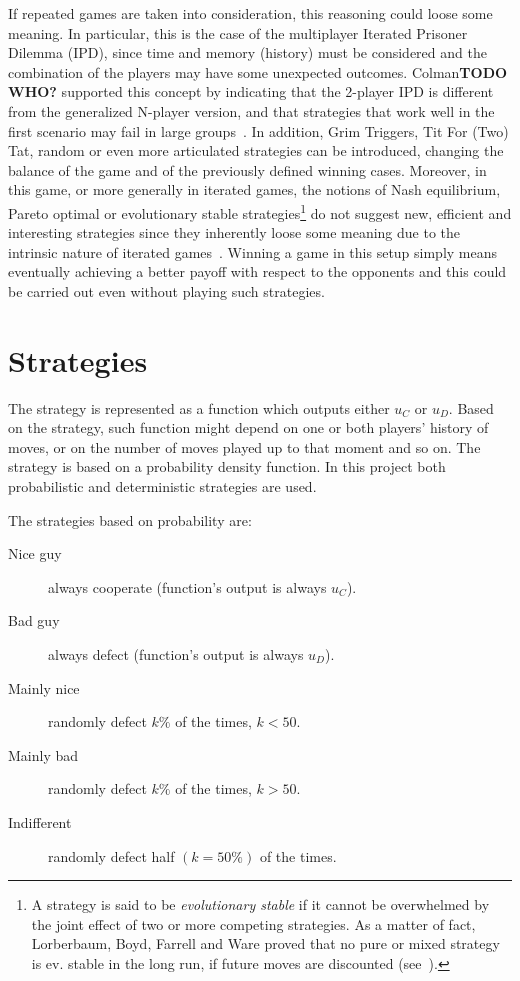 \documentclass[journal,10pt,twoside]{IEEEtran}
\begin{document}
If repeated games are taken into consideration, this reasoning could loose some meaning. In particular, this is the case of the multiplayer Iterated Prisoner Dilemma (IPD), since time and memory (history) must be considered and the combination of the players may have some unexpected outcomes.
Colman\textbf{TODO WHO?} supported this concept by indicating that the 2-player IPD is different from the generalized N-player version, and that strategies that work well in the first scenario may fail in large groups~\cite{yao1994experimental}.
In addition, Grim Triggers, Tit For (Two) Tat, random or even more articulated strategies can be introduced, changing the balance of the game and of the previously defined winning cases.
Moreover, in this game, or more generally in iterated games, the notions of Nash equilibrium, Pareto optimal or evolutionary stable strategies\footnote{A strategy is said to be \textit{evolutionary stable} if it cannot be overwhelmed by the joint effect of two or more competing strategies. As a matter of fact, Lorberbaum, Boyd, Farrell and Ware proved that no pure or mixed strategy is ev. stable in the long run, if future moves are discounted (see~\cite{lorb94}).} do not suggest new, efficient and interesting strategies since they inherently loose some meaning due to the intrinsic nature of iterated games~\cite{mathieu2017}.
Winning a game in this setup simply means eventually achieving a better payoff with respect to the opponents and this could be carried out even without playing such strategies.

\section{Strategies} \label{s:str}
The strategy is represented as a function which outputs either $u_C$ or $u_D$. Based on the strategy, such function might depend on one or both players' history of moves, or on the number of moves played up to that moment and so on.
The strategy is based on a probability density function. In this project both probabilistic and deterministic strategies are used.

The strategies based on probability are:
\begin{description}
    \item[Nice guy] always cooperate (function's output is always $u_C$).
    \item[Bad guy] always defect (function's output is always $u_D$).
    \item[Mainly nice] randomly defect $k\%$ of the times, $k<50$.
    \item[Mainly bad] randomly defect $k\%$ of the times, $k>50$.
    \item[Indifferent] randomly defect half $(k=50\%)$ of the times.
\end{description}
\end{document}
